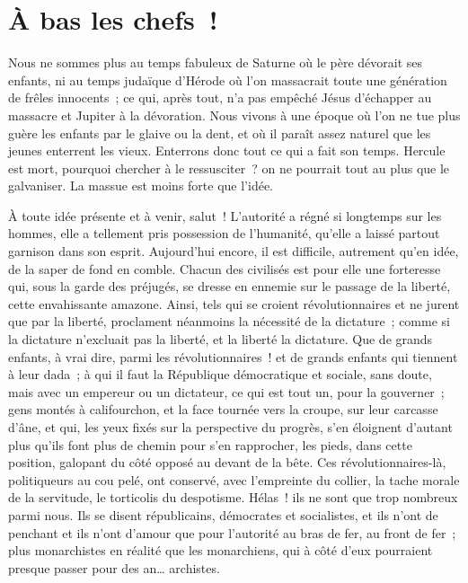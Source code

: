 \documentclass[french,twoside]{book} %
\begin{document}
  \chapter[{À bas les chefs !}]{À bas les chefs !}
\noindent Nous ne sommes plus au temps fabuleux de Saturne où le père dévorait ses enfants, ni au temps judaïque d’Hérode où l’on massacrait toute une génération de frêles innocents ; ce qui, après tout, n’a pas empêché Jésus d’échapper au massacre et Jupiter à la dévoration. Nous vivons à une époque où l’on ne tue plus guère les enfants par le glaive ou la dent, et où il paraît assez naturel que les jeunes enterrent les vieux. Enterrons donc tout ce qui a fait son temps. Hercule est mort, pourquoi chercher à le ressusciter ? on ne pourrait tout au plus que le galvaniser. La massue est moins forte que l’idée.\par
À toute idée présente et à venir, salut ! L’autorité a régné si longtemps sur les hommes, elle a tellement pris possession de l’humanité, qu’elle a laissé partout garnison dans son esprit. Aujourd’hui encore, il est difficile, autrement qu’en idée, de la saper de fond en comble. Chacun des civilisés est pour elle une forteresse qui, sous la garde des préjugés, se dresse en ennemie sur le passage de la liberté, cette envahissante amazone. Ainsi, tels qui se croient révolutionnaires et ne jurent que par la liberté, proclament néanmoins la nécessité de la dictature ; comme si la dictature n’excluait pas la liberté, et la liberté la dictature. Que de grands enfants, à vrai dire, parmi les révolutionnaires ! et de grands enfants qui tiennent à leur dada ; à qui il faut la République démocratique et sociale, sans doute, mais avec un empereur ou un dictateur, ce qui est tout un, pour la gouverner ; gens montés à califourchon, et la face tournée vers la croupe, sur leur carcasse d’âne, et qui, les yeux fixés sur la perspective du progrès, s’en éloignent d’autant plus qu’ils font plus de chemin pour s’en rapprocher, les pieds, dans cette position, galopant du côté opposé au devant de la bête. Ces révolutionnaires-là, politiqueurs au cou pelé, ont conservé, avec l’empreinte du collier, la tache morale de la servitude, le torticolis du despotisme. Hélas ! ils ne sont que trop nombreux parmi nous. Ils se disent républicains, démocrates et socialistes, et ils n’ont de penchant et ils n’ont d’amour que pour l’autorité au bras de fer, au front de fer ; plus monarchistes en réalité que les monarchiens, qui à côté d’eux pourraient presque passer pour des an… archistes.\par
\end{document}
